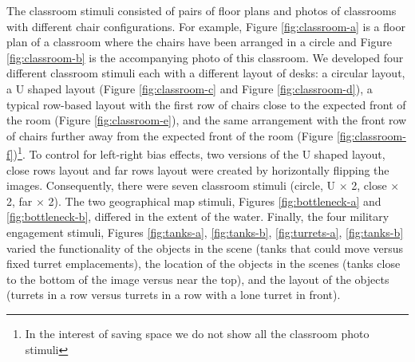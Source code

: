 \documentclass[11pt,letterpaper]{article}
\begin{document}
The classroom stimuli consisted of pairs of floor plans and photos of classrooms with different chair configurations. For example, Figure \ref{fig:classroom-a} is a floor plan of a classroom where the chairs have been arranged in a circle and Figure \ref{fig:classroom-b} is the accompanying photo of this classroom. We developed four different classroom stimuli each with a different layout of desks: a circular layout, a U shaped layout (Figure \ref{fig:classroom-c} and Figure \ref{fig:classroom-d}), a typical row-based layout with the first row of chairs close to the expected front of the room (Figure \ref{fig:classroom-e}), and the same arrangement with the front row of chairs further away from the expected front of the room (Figure \ref{fig:classroom-f})\footnote{In the interest of saving space we do not show all the classroom photo stimuli}. To control for left-right bias effects, two versions of the U shaped layout, close rows layout and far rows layout were created by horizontally flipping the images. Consequently, there were seven classroom stimuli (circle, U $\times$ 2, close $\times$ 2, far $\times$ 2).  The two geographical map stimuli, Figures \ref{fig:bottleneck-a} and \ref{fig:bottleneck-b}, differed in the extent of the water.  Finally, the four military engagement stimuli, Figures \ref{fig:tanks-a}, \ref{fig:tanks-b}, \ref{fig:turrets-a}, \ref{fig:tanks-b} varied the functionality of the objects in the scene (tanks that could move versus fixed turret emplacements), the location of the objects in the scenes (tanks close to the bottom of the image versus near the top), and the layout of the objects (turrets in a row versus turrets in a row with a lone turret in front). 
\end{document}
